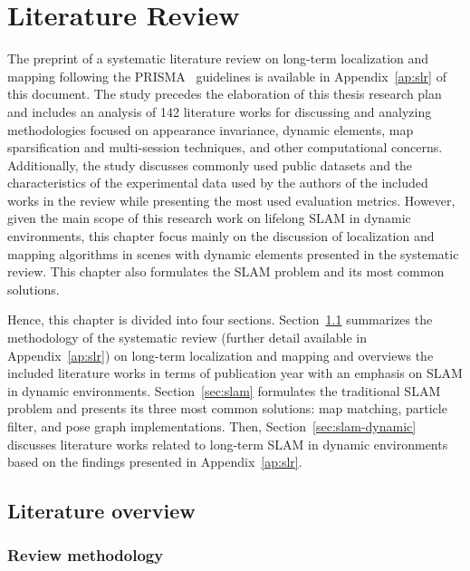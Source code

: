 \chapter{Literature Review}\label{chap:literature}

The preprint of a systematic literature review on long-term localization and mapping following the \gls{PRISMA}~\cite{methodology:prisma} guidelines is available in Appendix~\ref{ap:slr} of this document.
The study precedes the elaboration of this thesis research plan and includes an analysis of 142 literature works for discussing and analyzing methodologies focused on appearance invariance, dynamic elements, map sparsification and multi-session techniques, and other computational concerns.
Additionally, the study discusses commonly used public datasets and the characteristics of the experimental data used by the authors of the included works in the review while presenting the most used evaluation metrics.
However, given the main scope of this research work on lifelong \gls{SLAM} in dynamic environments, this chapter focus mainly on the discussion of localization and mapping algorithms in scenes with dynamic elements presented in the systematic review. This chapter also formulates the \gls{SLAM} problem and its most common solutions.

Hence, this chapter is divided into four sections.
Section~\ref{sec:literature-overview} summarizes the methodology of the systematic review (further detail available in Appendix~\ref{ap:slr}) on long-term localization and mapping and overviews the included literature works in terms of publication year with an emphasis on \gls{SLAM} in dynamic environments.
Section~\ref{sec:slam} formulates the traditional \gls{SLAM} problem and presents its three most common solutions: map matching, particle filter, and pose graph implementations.
Then, Section~\ref{sec:slam-dynamic} discusses literature works related to long-term \gls{SLAM} in dynamic environments based on the findings presented in Appendix~\ref{ap:slr}.






\section{Literature overview}\label{sec:literature-overview}

\subsection{Review methodology}

